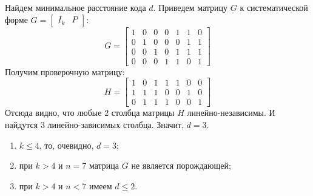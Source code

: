 \documentclass{article}
\begin{document}
Найдем минимальное расстояние кода $d$. Приведем матрицу $G$ к систематической форме $G = \begin{bmatrix}I_{k} & P\end{bmatrix}$:
$$G = 
    \begin{bmatrix} 
        1 & 0 & 0 & 0 & 1 & 1 & 0 \\ 	
        0 & 1 & 0 & 0 & 0 & 1 & 1 \\
        0 & 0 & 1 & 0 & 1 & 1 & 1 \\
        0 & 0 & 0 & 1 & 1 & 0 & 1
    \end{bmatrix}
$$
Получим проверочную матрицу:
$$H = 
    \begin{bmatrix} 
        1 & 0 & 1 & 1 & 1 & 0 & 0 \\	
        1 & 1 & 1 & 0 & 0 & 1 & 0 \\	
        0 & 1 & 1 & 1 & 0 & 0 & 1
    \end{bmatrix}
$$
Отсюда видно, что любые $2$ столбца матрицы $H$ линейно-независимы. И найдутся $3$ линейно-зависимых столбца. Значит, $d=3$.
\begin{enumerate}
    \item $k \leq 4$, то, очевидно, $d=3$;
    \item при $k > 4$ и $n = 7$ матрица $G$ не является порождающей;
    \item при $k > 4$ и $n < 7$ имеем $d \leq 2$.
\end{enumerate}
%
\end{document}
